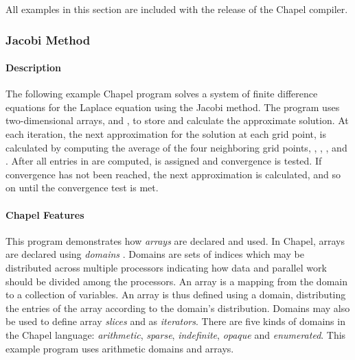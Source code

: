 All examples in this section are included with the release of the Chapel compiler.

\subsubsection{Jacobi Method}

\paragraph{Description}
The following example Chapel program solves a system of finite difference
equations for the Laplace equation using the Jacobi method.  The program uses
two-dimensional arrays,  and , to store and calculate the approximate
solution.  At each iteration, the next approximation for the solution at 
each grid point,  is calculated by computing the average of 
the four neighboring grid points,
, , , and .  
After all entries in  are computed,  is assigned 
and convergence is tested.  If convergence has not been reached, the next
approximation is calculated, and so on until the convergence test is met.

\paragraph{Chapel Features}
This program demonstrates how {\em arrays}  
are declared and used.  In Chapel, 
arrays are declared using {\em domains} .  
Domains are sets of indices which may be distributed
across multiple processors indicating how data and parallel work should
be divided among the processors.  An array is a mapping from the domain
to a collection of variables.  An array is thus defined using a domain, distributing
the entries of the array according to the domain's distribution.
Domains may also be used to define array {\em slices} and as {\em iterators}.
There are five kinds of domains in
the Chapel language:
  {\em arithmetic}, {\em sparse}, {\em indefinite},
{\em opaque} and {\em enumerated}.  This example program uses arithmetic domains
and arrays.  

